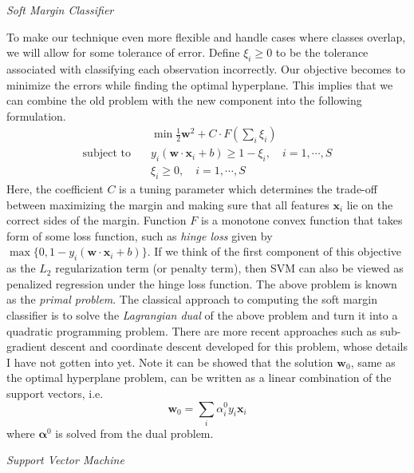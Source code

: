 \documentclass[12pt]{article}
\theoremstyle{definition}
\begin{document}
\vspace{0.3cm}
\noindent\textit{Soft Margin Classifier}

To make our technique even more flexible and handle cases where classes overlap, we will allow for some tolerance of error. Define $\xi_i\geq0$ to be the tolerance associated with classifying each observation incorrectly. Our objective becomes to minimize the errors while finding the optimal hyperplane. This implies that we can combine the old problem with the new component into the following formulation.
\begin{align}
&\min \frac{1}{2}\mathbf{w}^2+C\cdot F\left(\sum_i \xi_i\right) \nonumber\\
\text{subject to}\quad & y_i(\mathbf{w}\cdot\mathbf{x}_i+b)\geq 1-\xi_i,\quad i=1,\cdots,S \\
&\xi_i\geq0,\quad i=1,\cdots,S
\end{align}
Here, the coefficient $C$ is a tuning parameter which determines the trade-off between maximizing the margin and making sure that all features $\mathbf{x}_i$ lie on the correct sides of the margin. Function $F$ is a monotone convex function that takes form of some loss function, such as \textit{hinge loss} given by $\max\{0,1-y_i(\mathbf{w}\cdot\mathbf{x}_i+b)\}$. If we think of the first component of this objective as the $L_2$ regularization term (or penalty term), then SVM can also be viewed as penalized regression under the hinge loss function. The above problem is known as the \textit{primal problem}. The classical approach to computing the soft margin classifier is to solve the \textit{Lagrangian dual} of the above problem and turn it into a quadratic programming problem. There are more recent approaches such as sub-gradient descent and coordinate descent developed for this problem, whose details I have not gotten into yet. 
Note it can be showed that the solution $\mathbf{w}_0$, same as the optimal hyperplane problem, can be written as a linear combination of the support vectors, i.e. 
\begin{equation}
    \mathbf{w}_0=\sum_i \alpha_i^0 y_i\mathbf{x}_i
\end{equation}
where $\bm{\alpha}^0$ is solved from the dual problem.


\vspace{0.3cm}
\noindent\textit{Support Vector Machine}
\end{document}
